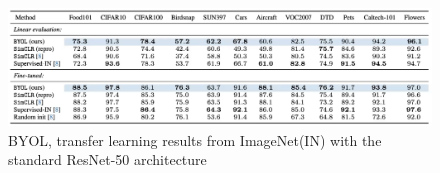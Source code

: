 \documentclass{article}
\begin{document}
\begin{figure}[H]
   \centering
   \includegraphics[width=0.8\linewidth]{figures/byol_results.png}
   \caption{BYOL, transfer learning results from ImageNet(IN)
   with the standard ResNet-50 architecture}
   \label{fig:byol_results}
\end{figure}
 


 
\end{document}
